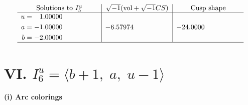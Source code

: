 \documentclass[1p]{elsarticle_modified}
\theoremstyle{definition}
\newcommand{\I}{\sqrt{-1}}
\begin{document}
$$\begin{array}{c|c|c}  
\text{Solutions to }I^u_{5}& \I (\text{vol} + \sqrt{-1}CS) & \text{Cusp shape}\\
 \hline 
\begin{aligned}
u &= \phantom{-}1.00000\phantom{ +0.000000I} \\
a &= -1.00000\phantom{ +0.000000I} \\
b &= -2.00000\phantom{ +0.000000I}\end{aligned}
 & -6.57974\phantom{ +0.000000I} & -24.0000\phantom{ +0.000000I}\\
 \hline 
 \end{array}$$\newpage\newpage\renewcommand{\arraystretch}{1}
\centering \section*{VI. $I^u_{6}= \langle b+1,\;a,\;u-1 \rangle$}
\flushleft \textbf{(i) Arc colorings}\\
\end{document}
